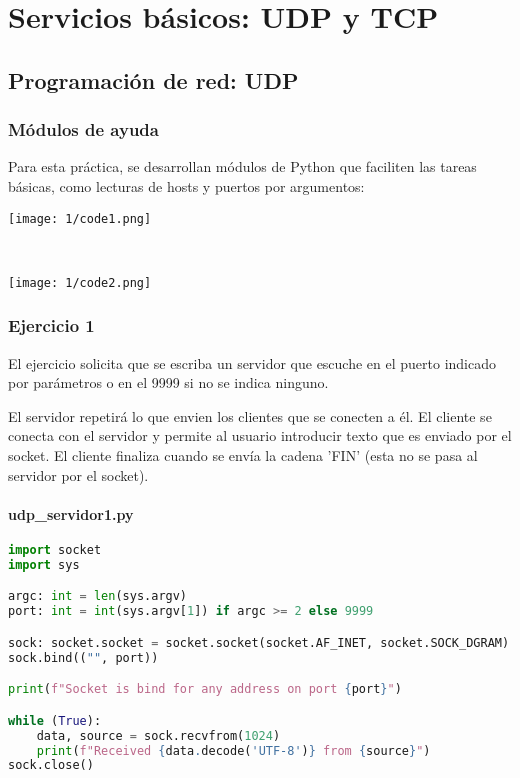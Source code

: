 \chapter{Servicios básicos: UDP y TCP}\label{chap:1}
\section{Programación de red: UDP}
\subsection{Módulos de ayuda}
Para esta práctica, se desarrollan módulos de Python que faciliten las tareas básicas,
como lecturas de hosts y puertos por argumentos: \\
\begin{minipage}{\linewidth}
	\centering
	\texttt{[image: 1/code1.png]}
	\label{fig:1/code1}
\end{minipage}
\\
\begin{minipage}{\linewidth}
	\centering
	\texttt{[image: 1/code2.png]}
	\label{fig:1/code2}
\end{minipage}

\subsection{Ejercicio 1}

El ejercicio solicita que se escriba un servidor que escuche en el puerto indicado por parámetros
o en el 9999 si no se indica ninguno.

El servidor repetirá lo que envien los clientes que se conecten a él.
El cliente se conecta con el servidor y permite al usuario introducir texto que es enviado por el socket.
El cliente finaliza cuando se envía la cadena 'FIN' (esta no se pasa al servidor por el socket).

\subsubsection{udp\_servidor1.py}

\begin{lstlisting}[language=Python]
import socket
import sys

argc: int = len(sys.argv)
port: int = int(sys.argv[1]) if argc >= 2 else 9999

sock: socket.socket = socket.socket(socket.AF_INET, socket.SOCK_DGRAM)
sock.bind(("", port))

print(f"Socket is bind for any address on port {port}")

while (True):
    data, source = sock.recvfrom(1024)
    print(f"Received {data.decode('UTF-8')} from {source}")
sock.close()
\end{lstlisting}

